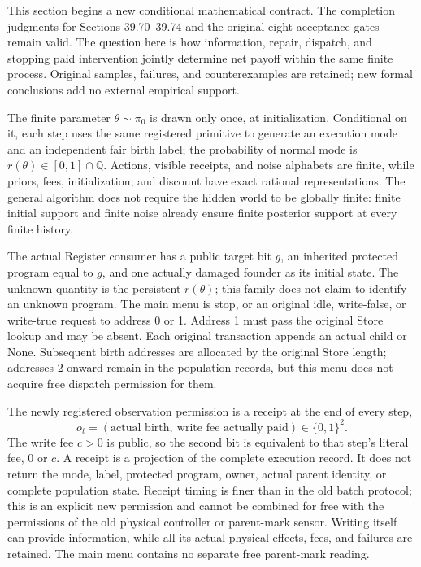 \documentclass[
  english,
  11pt,
  oneside]{book}
\begin{document}
This section begins a new conditional mathematical contract. The completion judgments for Sections 39.70--39.74 and the original eight acceptance gates remain valid. The question here is how information, repair, dispatch, and stopping paid intervention jointly determine net payoff within the same finite process. Original samples, failures, and counterexamples are retained; new formal conclusions add no external empirical support.

The finite parameter \(\theta\sim\pi_0\) is drawn only once, at initialization. Conditional on it, each step uses the same registered primitive to generate an execution mode and an independent fair birth label; the probability of normal mode is \(r(\theta)\in[0,1]\cap\mathbb Q\). Actions, visible receipts, and noise alphabets are finite, while priors, fees, initialization, and discount have exact rational representations. The general algorithm does not require the hidden world to be globally finite: finite initial support and finite noise already ensure finite posterior support at every finite history.

The actual Register consumer has a public target bit \(g\), an inherited protected program equal to \(g\), and one actually damaged founder as its initial state. The unknown quantity is the persistent \(r(\theta)\); this family does not claim to identify an unknown program. The main menu is stop, or an original idle, write-false, or write-true request to address 0 or 1. Address 1 must pass the original Store lookup and may be absent. Each original transaction appends an actual child or None. Subsequent birth addresses are allocated by the original Store length; addresses 2 onward remain in the population records, but this menu does not acquire free dispatch permission for them.

The newly registered observation permission is a receipt at the end of every step, \[o_t=(\text{actual birth},\ \text{write fee actually paid})\in\{0,1\}^2.\] The write fee \(c>0\) is public, so the second bit is equivalent to that step's literal fee, \(0\) or \(c\). A receipt is a projection of the complete execution record. It does not return the mode, label, protected program, owner, actual parent identity, or complete population state. Receipt timing is finer than in the old batch protocol; this is an explicit new permission and cannot be combined for free with the permissions of the old physical controller or parent-mark sensor. Writing itself can provide information, while all its actual physical effects, fees, and failures are retained. The main menu contains no separate free parent-mark reading.
\end{document}
